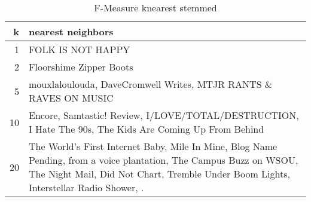 \documentclass[letterpaper,10pt]{article}
\begin{document}
\begin{table}[H]
\begin{minipage}{0.48\textwidth}
\label{tab:fmknns} 
\end{minipage}%
\hfill
\begin{minipage}{0.48\textwidth}
\centering
\begin{tabular}{rp{5cm}}
\hline
   k & nearest neighbors                                                                                                                                                                                          \\
\hline
   1 & FOLK IS NOT HAPPY                                                                                                                                                                                          \\ \hline
   2 & Floorshime Zipper Boots                                                                                                                                                                                    \\ \hline
   5 & mouxlaloulouda, DaveCromwell Writes, MTJR RANTS \& RAVES ON MUSIC                                                                                                                                           \\ \hline
  10 & Encore, Samtastic! Review, I/LOVE/TOTAL/DESTRUCTION, I Hate The 90s, The Kids Are Coming Up From Behind                                                                                                    \\ \hline
  20 & The World's First Internet Baby, Mile In Mine, Blog Name Pending, from a voice plantation, The Campus Buzz on WSOU, The Night Mail, Did Not Chart, Tremble Under Boom Lights, Interstellar Radio Shower, . \\
\hline
\end{tabular}
 \caption{F-Measure knearest stemmed} 
 \label{tab:fmkns} 
\end{minipage}
\end{table}
\end{document}
